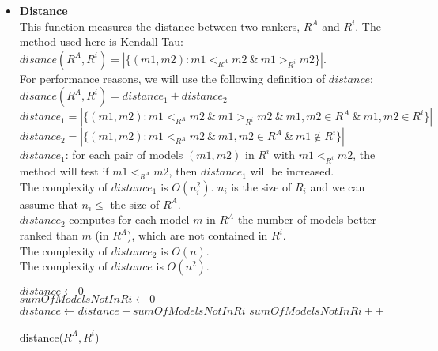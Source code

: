 \documentclass{article}
\begin{document}
	  \begin{itemize}
	  
	  	\item \textbf{Distance}\\
	  	 This function measures the distance between two rankers, $R^A$ and $R^i$. The method used here is Kendall-Tau:\\
	  	 $disance(R^A, R^i) = |\{(m1, m2): m1 <_{R^A} m2 ~ \& ~ m1 >_{R^i} m2 \}|$.\\
	  	 For performance reasons, we will use the following definition of $distance$:\\
	  	 $disance(R^A, R^i) = distance_1 + distance_2$ \\
	  	 $distance_1 = |\{(m1, m2): m1 <_{R^A} m2 ~ \& ~ m1 >_{R^i} m2 ~ \& ~ m1, m2 \in R^A ~ \& ~ m1, m2 \in R^i\}|$\\ 
	  	 $distance_2 = |\{(m1, m2): m1 <_{R^A} m2 ~ \& ~ m1, m2 \in R^A ~ \& ~ m1 \notin R^i\}|$\\
	  	 $distance_1$: for each pair of models $(m1, m2)$ in $R^i$ with  $m1 <_{R^i} m2$, the method will test if $m1 <_{R^A} m2$, then $distance_1$ will be increased.\\
	  	 The complexity of $distance_1$ is $O(n_i^2)$. $n_i$ is the size of $R_i$ and we can assume that $n_i \leq$ the size of $R^A$.\\
	  	 $distance_2$ computes for each model $m$ in $R^A$ the number of models better ranked than $m$ (in $R^A$), which are not contained in $R^i$.\\
	  	 The complexity of $distance_2$ is $O(n)$.\\
	  	 The complexity of $distance$ is $O(n^2)$.\\
	  	 	  	 
	  	 \begin{algorithm}
	       $distance \leftarrow 0$\\
	       $sumOfModelsNotInRi \leftarrow 0$\\
	       {
	      		{$distance \leftarrow distance + sumOfModelsNotInRi$}
	      	\Else
	      		{$sumOfModelsNotInRi ++$}
	      	}
	      	
	       {
	      }
	      \caption{distance($R^A, R^i$)}
	     \end{algorithm}
	   

\end{itemize}
\end{document}
